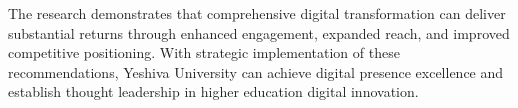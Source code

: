 \documentclass[12pt]{report}
\begin{document}
The research demonstrates that comprehensive digital transformation can deliver substantial returns through enhanced engagement, expanded reach, and improved competitive positioning. With strategic implementation of these recommendations, Yeshiva University can achieve digital presence excellence and establish thought leadership in higher education digital innovation.
\end{document}

